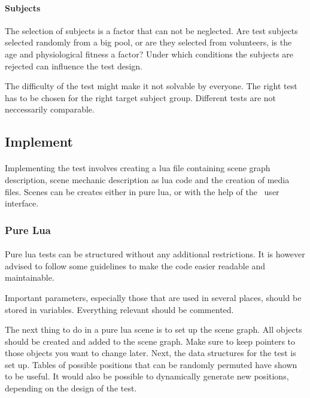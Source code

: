 \paragraph{Subjects}
The selection of subjects is a factor that can not be neglected.
Are test subjects selected randomly from a big pool, or are they selected from volunteers,
is the age and physiological fitness a factor?
Under which conditions the subjects are rejected can influence the test design.

The difficulty of the test might make it not solvable by everyone.
The right test has to be chosen for the right target subject group.
Different tests are not neccessarily comparable.


\subsection{Implement}
\paragraph{}
Implementing the test involves creating a lua file containing scene graph description,
scene mechanic description as lua code and the creation of media files.
Scenes can be creates either in pure lua, or with the help of the \ER\ user interface.

\subsubsection{Pure Lua}
\paragraph{}
Pure lua tests can be structured without any additional restrictions.
It is however advised to follow some guidelines to make the code easier readable
and maintainable.

Important parameters, especially those that are used in several places, should be stored in variables.
Everything relevant should be commented.

The next thing to do in a pure lua scene is to set up the scene graph.
All objects should be created and added to the scene graph.
Make sure to keep pointers to those objects you want to change later.
Next, the data structures for the test is set up.
Tables of possible positions that can be randomly permuted have shown to be useful.
It would also be possible to dynamically generate new positions, depending on the design of the test.

